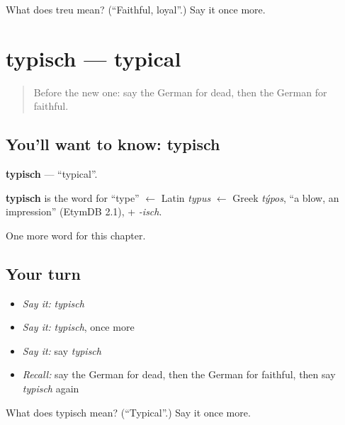 \begin{tcolorbox}[breakable,colback=teal!4,colframe=teal!35!black,title={Before you move on}]
What does treu mean? (\textquotedblleft{}Faithful, loyal\textquotedblright{}.) Say it once more.
\end{tcolorbox}
\section[typisch]{typisch — typical}

\label{lesson:GE-C223-typisch}



\begin{quote}
Before the new one: say the German for dead, then the German for faithful.
\end{quote}

\subsection*{You'll want to know: typisch}
\textbf{typisch} — \textquotedblleft{}typical\textquotedblright{}.

\begin{cousinweb}
\textbf{typisch} is the word for \textquotedblleft{}type\textquotedblright{} $\leftarrow$ Latin \emph{typus} $\leftarrow$ Greek \emph{týpos}, \textquotedblleft{}a blow, an impression\textquotedblright{} (EtymDB 2.1), + \emph{-isch}.
\end{cousinweb}

\begin{grammarlens}[title={What you've built}]
One more word for this chapter.
\end{grammarlens}

\subsection*{Your turn}
\begin{itemize}
\raggedright
  \item \emph{Say it:} \emph{typisch}
  \item \emph{Say it:} \emph{typisch}, once more
  \item \emph{Say it:} say \emph{typisch}
  \item \emph{Recall:} say the German for dead, then the German for faithful, then say \emph{typisch} again
\end{itemize}

\begin{tcolorbox}[breakable,colback=teal!4,colframe=teal!35!black,title={Before you move on}]
What does typisch mean? (\textquotedblleft{}Typical\textquotedblright{}.) Say it once more.
\end{tcolorbox}
